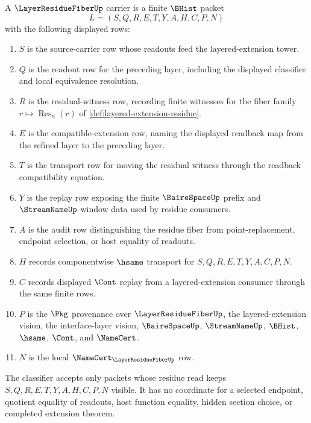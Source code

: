 \begin{definition}
\label{def:layer-residue-fiber-carrier}
A $\LayerResidueFiberUp$ carrier is a finite $\BHist$ packet
$$
L=(S,Q,R,E,T,Y,A,H,C,P,N)
$$
with the following displayed rows:
\begin{enumerate}
\item $S$ is the source-carrier row whose readouts feed the layered-extension tower.
\item $Q$ is the readout row for the preceding layer, including the displayed classifier and local equivalence resolution.
\item $R$ is the residual-witness row, recording finite witnesses for the fiber family $r\mapsto\operatorname{Res}_n(r)$ of \autoref{def:layered-extension-residue}.
\item $E$ is the compatible-extension row, naming the displayed readback map from the refined layer to the preceding layer.
\item $T$ is the transport row for moving the residual witness through the readback compatibility equation.
\item $Y$ is the replay row exposing the finite $\BaireSpaceUp$ prefix and $\StreamNameUp$ window data used by residue consumers.
\item $A$ is the audit row distinguishing the residue fiber from point-replacement, endpoint selection, or host equality of readouts.
\item $H$ records componentwise $\hsame$ transport for $S,Q,R,E,T,Y,A,C,P,N$.
\item $C$ records displayed $\Cont$ replay from a layered-extension consumer through the same finite rows.
\item $P$ is the $\Pkg$ provenance over $\LayerResidueFiberUp$, the layered-extension vision, the interface-layer vision, $\BaireSpaceUp$, $\StreamNameUp$, $\BHist$, $\hsame$, $\Cont$, and $\NameCert$.
\item $N$ is the local $\NameCert_{\LayerResidueFiberUp}$ row.
\end{enumerate}
The classifier accepts only packets whose residue read keeps $S,Q,R,E,T,Y,A,H,C,P,N$ visible. It has no coordinate for a selected endpoint, quotient equality of readouts, host function equality, hidden section choice, or completed extension theorem.
\end{definition}

